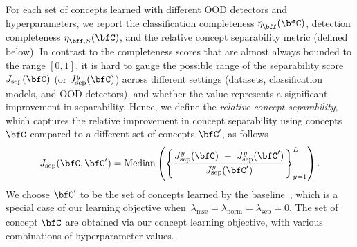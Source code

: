 For each set of concepts learned with different OOD detectors and hyperparameters, we report the classification completeness $\eta^{}_{\bff}(\bfC)$, detection completeness $\eta^{}_{\bff, S}(\bfC)$, and the relative concept separability metric (defined below). 
In contrast to the completeness scores that are almost always bounded to the range $[0, 1]$, it is hard to gauge the possible range of the separability score $J_{\textrm{sep}}(\bfC)$ (or $J^y_{\textrm{sep}}(\bfC)$) across different settings (datasets, classification models, and OOD detectors), and whether the value represents a significant improvement in separability.
Hence, we define the \textit{relative concept separability}, which captures the relative improvement in concept separability using concepts $\bfC$ compared to a different set of concepts $\bfC'$, as follows
\begin{equation}
\label{eq:relative-separability}
J_{\textrm{sep}}(\bfC, \bfC') = \textrm{Median}\left( \left\{\frac{J^y_{\textrm{sep}}(\bfC) ~-~ J^y_{\textrm{sep}}(\bfC')}{J^y_{\textrm{sep}}(\bfC')}\right\}_{y=1}^L \right).   
\end{equation}
We choose $\bfC'$ to be the set of concepts learned by the baseline~\citep{yeh2020completeness}, which is a special case of our learning objective when $\,\lambda_\textrm{mse} = \lambda_\textrm{norm} = \lambda_\textrm{sep} = 0$.
The set of concept $\bfC$ are obtained via our concept learning objective, with various combinations of hyperparameter values.

